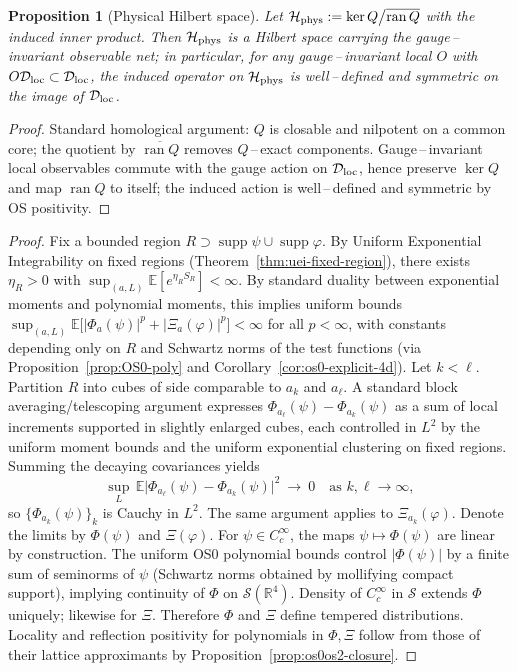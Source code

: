 \documentclass[11pt]{amsart}
\theoremstyle{plain}
\newtheorem{proposition}[theorem]{Proposition}
\theoremstyle{definition}
\theoremstyle{remark}
\begin{document}
\begin{proposition}[Physical Hilbert space]\label{prop:physical-hilbert}
Let $\mathcal H_{\rm phys}:=\ker Q\big/\overline{\operatorname{ran} Q}$ with the induced inner product. Then $\mathcal H_{\rm phys}$ is a Hilbert space carrying the gauge\,–\,invariant observable net; in particular, for any gauge\,–\,invariant local $O$ with $O\mathcal D_{\rm loc}\subset\mathcal D_{\rm loc}$, the induced operator on $\mathcal H_{\rm phys}$ is well\,–\,defined and symmetric on the image of $\mathcal D_{\rm loc}$.
\end{proposition}
\begin{proof}
Standard homological argument: $Q$ is closable and nilpotent on a common core; the quotient by $\overline{\operatorname{ran} Q}$ removes $Q$\,–\,exact components. Gauge\,–\,invariant local observables commute with the gauge action on $\mathcal D_{\rm loc}$, hence preserve $\ker Q$ and map $\operatorname{ran} Q$ to itself; the induced action is well\,–\,defined and symmetric by OS positivity.
\end{proof}
\begin{proof}
Fix a bounded region $R\supset \operatorname{supp}\psi\cup\operatorname{supp}\varphi$. By Uniform Exponential Integrability on fixed regions (Theorem~\ref{thm:uei-fixed-region}), there exists $\eta_R>0$ with $\sup_{(a,L)} \mathbb E[e^{\eta_R S_R}]<\infty$. By standard duality between exponential moments and polynomial moments, this implies uniform bounds $\sup_{(a,L)}\mathbb E\big[|\Phi_a(\psi)|^p+|\Xi_a(\varphi)|^p\big]<\infty$ for all $p<\infty$, with constants depending only on $R$ and Schwartz norms of the test functions (via Proposition~\ref{prop:OS0-poly} and Corollary~\ref{cor:os0-explicit-4d}).
Let $k<\ell$. Partition $R$ into cubes of side comparable to $a_k$ and $a_\ell$. A standard block averaging/telescoping argument expresses $\Phi_{a_\ell}(\psi)-\Phi_{a_k}(\psi)$ as a sum of local increments supported in slightly enlarged cubes, each controlled in $L^2$ by the uniform moment bounds and the uniform exponential clustering on fixed regions. Summing the decaying covariances yields
\[
  \sup_L\,\mathbb E\big|\Phi_{a_\ell}(\psi)-\Phi_{a_k}(\psi)\big|^2\ \longrightarrow\ 0\quad \text{as }k,\ell\to\infty,
\]
so $\{\Phi_{a_k}(\psi)\}_k$ is Cauchy in $L^2$. The same argument applies to $\Xi_{a_k}(\varphi)$. Denote the limits by $\Phi(\psi)$ and $\Xi(\varphi)$.
For $\psi\in C_c^\infty$, the maps $\psi\mapsto \Phi(\psi)$ are linear by construction. The uniform OS0 polynomial bounds control $|\Phi(\psi)|$ by a finite sum of seminorms of $\psi$ (Schwartz norms obtained by mollifying compact support), implying continuity of $\Phi$ on $\mathcal S(\mathbb R^4)$. Density of $C_c^\infty$ in $\mathcal S$ extends $\Phi$ uniquely; likewise for $\Xi$. Therefore $\Phi$ and $\Xi$ define tempered distributions. Locality and reflection positivity for polynomials in $\Phi,\Xi$ follow from those of their lattice approximants by Proposition~\ref{prop:os0os2-closure}.
\end{proof}
\end{document}
